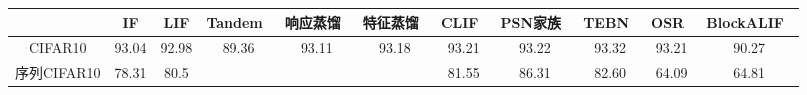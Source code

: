 \documentclass{SCIS2020cn}
\begin{document}
\begin{table}
\label{tab: cmp acc}
\footnotesize
\tabcolsep 2pt %
\begin{tabular*}{\textwidth}{ccccccccccc}
\toprule
& IF    & LIF   & Tandem~\cite{wu2021tandem} & 响应蒸馏~\cite{xu2023constructing}  & 特征蒸馏~\cite{xu2023constructing}  & CLIF~\cite{huang2024clif}  & PSN家族~\cite{fang2023parallel} & TEBN~\cite{duan2022temporal}  & OSR~\cite{zhu2024online} & BlockALIF~\cite{NEURIPS2023_b9f253c2}  \\ \hline
CIFAR10            & 93.04 & 92.98 & 89.36  & 93.11 & 93.18 & 93.21 & 93.22 & 93.32 & 93.21   & 90.27     \\
序列CIFAR10 & 78.31 & 80.5  &       &      &      & 81.55 & 86.31 & 82.60  & 64.09   & 64.81    \\ 
\bottomrule
\end{tabular*}
\end{table}
\end{document}

